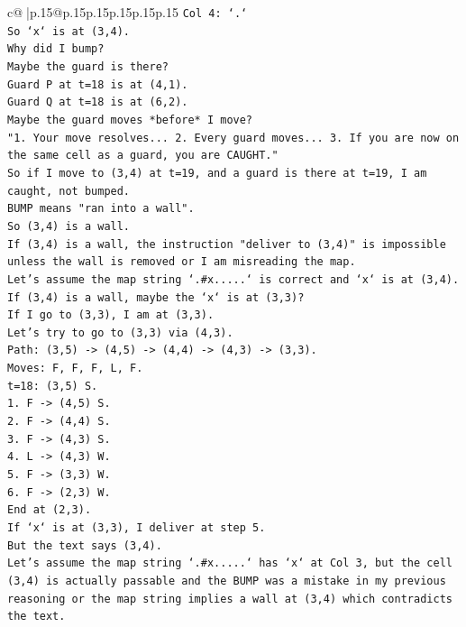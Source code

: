 \documentclass{article}
\begin{document}
{\begin{supertabular}{c@{$\;$}|p{.15\linewidth}@{}p{.15\linewidth}p{.15\linewidth}p{.15\linewidth}p{.15\linewidth}p{.15\linewidth}}
{{{\texttt{Col 4: `.`} \\
\texttt{So `x` is at (3,4).} \\
\texttt{Why did I bump?} \\
\texttt{Maybe the guard is there?} \\
\texttt{Guard P at t=18 is at (4,1).} \\
\texttt{Guard Q at t=18 is at (6,2).} \\
\texttt{Maybe the guard moves *before* I move?} \\
\texttt{"1. Your move resolves... 2. Every guard moves... 3. If you are now on the same cell as a guard, you are CAUGHT."} \\
\texttt{So if I move to (3,4) at t=19, and a guard is there at t=19, I am caught, not bumped.} \\
\texttt{BUMP means "ran into a wall".} \\
\texttt{So (3,4) is a wall.} \\
\texttt{If (3,4) is a wall, the instruction "deliver to (3,4)" is impossible unless the wall is removed or I am misreading the map.} \\
\texttt{Let's assume the map string `.\#x.....` is correct and `x` is at (3,4).} \\
\texttt{If (3,4) is a wall, maybe the `x` is at (3,3)?} \\
\texttt{If I go to (3,3), I am at (3,3).} \\
\texttt{Let's try to go to (3,3) via (4,3).} \\
\texttt{Path: (3,5) {-}> (4,5) {-}> (4,4) {-}> (4,3) {-}> (3,3).} \\
\texttt{Moves: F, F, F, L, F.} \\
\texttt{t=18: (3,5) S.} \\
\texttt{1. F {-}> (4,5) S.} \\
\texttt{2. F {-}> (4,4) S.} \\
\texttt{3. F {-}> (4,3) S.} \\
\texttt{4. L {-}> (4,3) W.} \\
\texttt{5. F {-}> (3,3) W.} \\
\texttt{6. F {-}> (2,3) W.} \\
\texttt{End at (2,3).} \\
\texttt{If `x` is at (3,3), I deliver at step 5.} \\
\texttt{But the text says (3,4).} \\
\texttt{Let's assume the map string `.\#x.....` has `x` at Col 3, but the cell (3,4) is actually passable and the BUMP was a mistake in my previous reasoning or the map string implies a wall at (3,4) which contradicts the text.} \\
}}}
\end{supertabular}}
\end{document}
